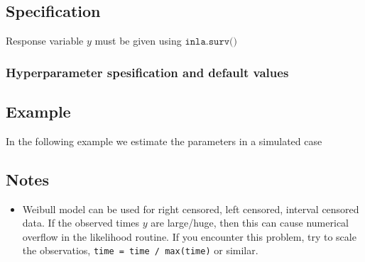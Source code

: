 \documentclass[a4paper,11pt]{article}
\begin{document}
\subsection*{Specification}

Response variable $y$ must be given using $\texttt{inla.surv()}$ 


\subsubsection*{Hyperparameter spesification and default values}

\begin{quote}
    
%    
\end{quote}

\subsection*{Example}

In the following example we estimate the parameters in a simulated
case 

\subsection*{Notes}

\begin{itemize}
\item Weibull model can be used for right censored, left censored,
    interval censored data. If the observed times $y$ are large/huge,
    then this can cause numerical overflow in the likelihood routine.
    If you encounter this problem, try to scale the observatios,
    \verb|time = time / max(time)| or similar.
\end{itemize}
\end{document}

